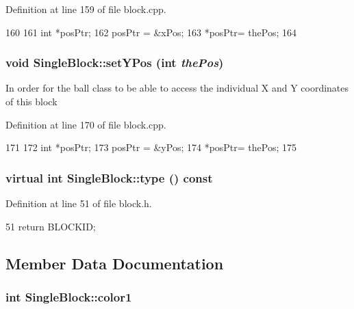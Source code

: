 Definition at line 159 of file block.cpp.


\begin{DoxyCode}
160 {
161     int *posPtr;
162     posPtr = &xPos;
163     *posPtr= thePos;
164 }
\end{DoxyCode}
\hypertarget{class_single_block_a0de6704830cc075cabdf40b5894e7fa9}{
\subsubsection[{setYPos}]{\setlength{\rightskip}{0pt plus 5cm}void SingleBlock::setYPos (int {\em thePos})}}
\label{class_single_block_a0de6704830cc075cabdf40b5894e7fa9}
In order for the ball class to be able to access the individual X and Y coordinates of this block 

Definition at line 170 of file block.cpp.


\begin{DoxyCode}
171 {
172     int *posPtr;
173     posPtr = &yPos;
174     *posPtr= thePos;
175 }
\end{DoxyCode}
\hypertarget{class_single_block_a1ee84715ceaa1c72cc5ad5d627f1ec67}{
\subsubsection[{type}]{\setlength{\rightskip}{0pt plus 5cm}virtual int SingleBlock::type () const}}
\label{class_single_block_a1ee84715ceaa1c72cc5ad5d627f1ec67}


Definition at line 51 of file block.h.


\begin{DoxyCode}
51 {return BLOCKID; }
\end{DoxyCode}


\subsection{Member Data Documentation}
\hypertarget{class_single_block_a750ddf3283bb57511c76688c9465b0c9}{
\subsubsection[{color1}]{\setlength{\rightskip}{0pt plus 5cm}int {\bf SingleBlock::color1}}}
\label{class_single_block_a750ddf3283bb57511c76688c9465b0c9}


